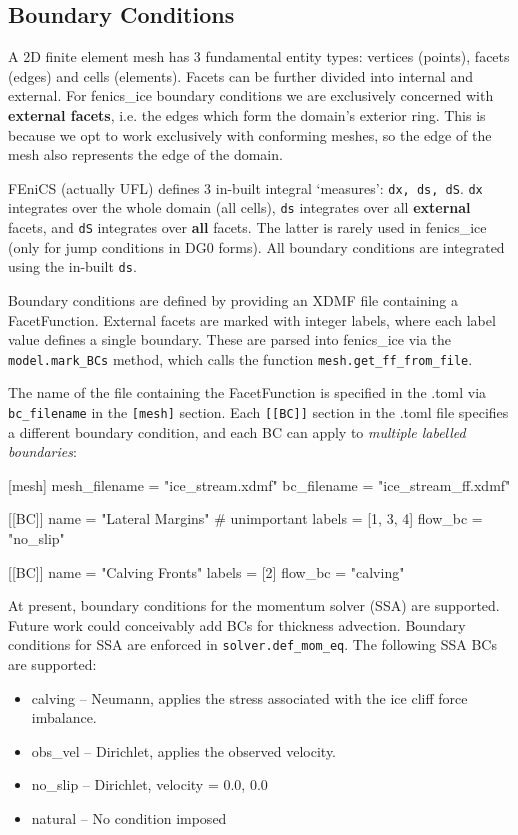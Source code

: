 \documentclass[11pt, reqno, nocenter]{article}
\begin{document}
\subsection{Boundary Conditions} \label{sec:bc}

A 2D finite element mesh has 3 fundamental entity types: vertices (points), facets (edges) and cells (elements). Facets can be further divided into internal and external. For fenics\_ice boundary conditions we are exclusively concerned with \textbf{external facets}, i.e. the edges which form the domain's exterior ring. This is because we opt to work exclusively with conforming meshes, so the edge of the mesh also represents the edge of the domain.

FEniCS (actually UFL) defines 3 in-built integral `measures': {\tt dx, ds, dS}. {\tt dx} integrates over the whole domain (all cells), {\tt ds} integrates over all \textbf{external} facets, and {\tt dS} integrates over \textbf{all} facets. The latter is rarely used in fenics\_ice (only for jump conditions in DG0 forms). All boundary conditions are integrated using the in-built {\tt ds}.

Boundary conditions are defined by providing an XDMF file containing a FacetFunction. External facets are marked with integer labels, where each label value defines a single boundary. These are parsed into fenics\_ice via the {\tt model.mark\_BCs} method, which calls the function {\tt mesh.get\_ff\_from\_file}.

The name of the file containing the FacetFunction is specified in the .toml via {\tt bc\_filename} in the {\tt [mesh]} section. Each {\tt [[BC]]} section in the .toml file specifies a different boundary condition, and each BC can apply to \emph{multiple labelled boundaries}:

\begin{spverbatim}

[mesh]
mesh_filename = "ice_stream.xdmf"
bc_filename = "ice_stream_ff.xdmf"

[[BC]]
name = "Lateral Margins" # unimportant
labels = [1, 3, 4]
flow_bc = "no_slip"

[[BC]]
name = "Calving Fronts"
labels = [2]
flow_bc = "calving"

\end{spverbatim}

At present, boundary conditions for the momentum solver (SSA) are supported. Future work could conceivably add BCs for thickness advection. Boundary conditions for SSA are enforced in {\tt solver.def\_mom\_eq}. The following SSA BCs are supported:
\begin{itemize}
\item calving -- Neumann, applies the stress associated with the ice cliff force imbalance.
\item obs\_vel -- Dirichlet, applies the observed velocity.
\item no\_slip -- Dirichlet, velocity = 0.0, 0.0
\item natural -- No condition imposed
\end{itemize}
\end{document}
